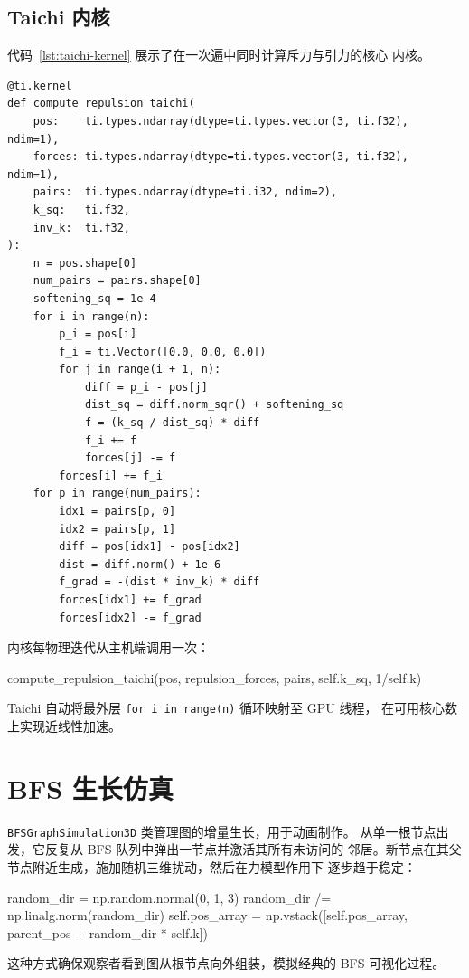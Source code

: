 \documentclass[11pt,a4paper]{report}
\begin{document}
\subsection{Taichi 内核}
\label{sec:taichi-kernel}
代码~\ref{lst:taichi-kernel} 展示了在一次遍中同时计算斥力与引力的核心
内核。
\begin{lstlisting}[style=pythonstyle,
                   caption=用于并行力计算的 Taichi 内核,
                   label=lst:taichi-kernel]
@ti.kernel
def compute_repulsion_taichi(
    pos:    ti.types.ndarray(dtype=ti.types.vector(3, ti.f32), ndim=1),
    forces: ti.types.ndarray(dtype=ti.types.vector(3, ti.f32), ndim=1),
    pairs:  ti.types.ndarray(dtype=ti.i32, ndim=2),
    k_sq:   ti.f32,
    inv_k:  ti.f32,
):
    n = pos.shape[0]
    num_pairs = pairs.shape[0]
    softening_sq = 1e-4
    for i in range(n):
        p_i = pos[i]
        f_i = ti.Vector([0.0, 0.0, 0.0])
        for j in range(i + 1, n):
            diff = p_i - pos[j]
            dist_sq = diff.norm_sqr() + softening_sq
            f = (k_sq / dist_sq) * diff
            f_i += f
            forces[j] -= f
        forces[i] += f_i
    for p in range(num_pairs):
        idx1 = pairs[p, 0]
        idx2 = pairs[p, 1]
        diff = pos[idx1] - pos[idx2]
        dist = diff.norm() + 1e-6
        f_grad = -(dist * inv_k) * diff
        forces[idx1] += f_grad
        forces[idx2] -= f_grad
\end{lstlisting}
内核每物理迭代从主机端调用一次：
\begin{pythoncode}
compute_repulsion_taichi(pos, repulsion_forces, pairs, self.k_sq, 1/self.k)
\end{pythoncode}
Taichi 自动将最外层 \lstinline{for i in range(n)} 循环映射至 GPU 线程，
在可用核心数上实现近线性加速。
\section{BFS 生长仿真}
\label{sec:bfs-sim}
\texttt{BFSGraphSimulation3D} 类管理图的增量生长，用于动画制作。
从单一根节点出发，它反复从 BFS 队列中弹出一节点并激活其所有未访问的
邻居。新节点在其父节点附近生成，施加随机三维扰动，然后在力模型作用下
逐步趋于稳定：
\begin{pythoncode}
random_dir = np.random.normal(0, 1, 3)
random_dir /= np.linalg.norm(random_dir)
self.pos_array = np.vstack([self.pos_array, parent_pos + random_dir * self.k])
\end{pythoncode}
这种方式确保观察者看到图从根节点向外组装，模拟经典的 BFS 可视化过程。
\end{document}
